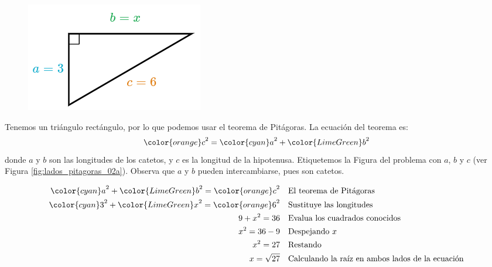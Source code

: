 \begin{minipage}[t][][t]{0.6\textwidth}
    \begin{solutionbox}{9.5cm}
        \begin{minipage}{0.4\textwidth}
            \begin{figure}[H]
                \centering
                \includegraphics[width=0.9\linewidth]{../images/lados_pitagoras_33a.png}
                \caption{}
                \label{fig:lados_pitagoras_33a}
            \end{figure}
        \end{minipage}\hfill
        \begin{minipage}{0.55\textwidth}
            Tenemos un triángulo rectángulo, por lo que podemos usar el teorema de Pitágoras.
            La ecuación del teorema es:
            \[{\color{orange}c}^2={\color{cyan}a}^2+{\color{LimeGreen}b}^2\]
            donde $a$ y $b$ son las longitudes de los catetos, y $c$ es la longitud de la hipotenusa.
            Etiquetemos la Figura del problema con $a$, $b$ y $c$ (ver Figura \ref{fig:lados_pitagoras_02a}).
            Observa que $a$ y $b$ pueden intercambiarse, pues son catetos.
        \end{minipage}
        \begin{align*}
            {\color{cyan}a}^2+{\color{LimeGreen}b}^2  ={\color{orange}c}^2 & \text{\quad El teorema de Pitágoras}                          \\
            {\color{cyan}3}^2+{\color{LimeGreen}x}^2  ={\color{orange}6}^2 & \text{\quad Sustituye las longitudes}                         \\
            9+x^2  =36                                                     & \text{\quad Evalua los cuadrados conocidos}                   \\
            x^2=36-9                                                       & \text{\quad Despejando } x                                    \\
            x^2=27                                                         & \text{\quad Restando}                                         \\
            x=\sqrt{27}                                                    & \text{\quad Calculando la raíz en ambos lados de la ecuación} \\
        \end{align*}
    \end{solutionbox}
\end{minipage}
